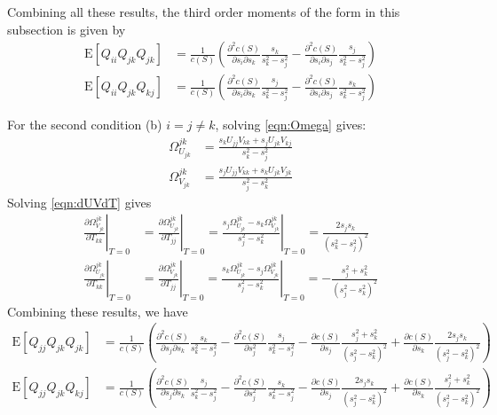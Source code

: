 \documentclass[10pt]{article}
\newcommand{\expect}[1]{\ensuremath{\mathrm{E}\left[ #1 \right]}}
\begin{document}
Combining all these results, the third order moments of the form in this subsection is given by
\begin{align} \label{eqn:iijkjk}
	\expect{Q_{ii}Q_{jk}Q_{jk}} &= \frac{1}{c(S)} \left( \frac{\partial^2 c(S)}{\partial s_i \partial s_k} \frac{s_k}{s_k^2-s_j^2} - \frac{\partial^2 c(S)}{\partial s_i \partial s_j} \frac{s_j}{s_k^2-s_j^2} \right) \nonumber \\
	\expect{Q_{ii}Q_{jk}Q_{kj}} &= \frac{1}{c(S)} \left( \frac{\partial^2 c(S)}{\partial s_i \partial s_k} \frac{s_j}{s_k^2-s_j^2} - \frac{\partial^2 c(S)}{\partial s_i \partial s_j} \frac{s_k}{s_k^2-s_j^2} \right)
\end{align}

For the second condition (b) $i=j\neq k$, solving \eqref{eqn:Omega} gives:
\begin{align}
	\Omega_{U_{jk}}^{jk} &= \frac{s_kU_{jj}V_{kk}+s_jU_{jk}V_{kj}}{s_k^2-s_j^2} \nonumber \\
	\Omega_{V_{jk}}^{jk} &= \frac{s_jU_{jj}V_{kk}+s_kU_{jk}V_{jk}}{s_j^2-s_k^2}
\end{align}
Solving \eqref{eqn:dUVdT} gives
\begin{align}
	\left.\frac{\partial \Omega_{V_{jk}}^{jk}}{\partial T_{kk}}\right|_{T=0} &=
	\left.\frac{\partial \Omega_{U_{jk}}^{jk}}{\partial T_{jj}}\right|_{T=0} = \left.\frac{s_j\Omega_{U_{jk}}^{jk} - s_k\Omega_{V_{jk}}^{jk}}{s_j^2-s_k^2}\right|_{T=0} = \frac{2s_js_k}{(s_k^2-s_j^2)^2} \nonumber \\
	\left.\frac{\partial \Omega_{U_{jk}}^{jk}}{\partial T_{kk}}\right|_{T=0} &= \left.\frac{\partial \Omega_{V_{jk}}^{jk}}{\partial T_{jj}}\right|_{T=0} = \left.\frac{s_k\Omega_{U_{jk}}^{jk} - s_j\Omega_{V_{jk}}^{jk}}{s_j^2-s_k^2}\right|_{T=0} = -\frac{s_j^2+s_k^2}{(s_j^2-s_k^2)^2}
\end{align}
Combining these results, we have
\begin{align} \label{eqn:jjjkjk}
	\expect{Q_{jj}Q_{jk}Q_{jk}} &= \frac{1}{c(S)} \left( \frac{\partial^2 c(S)}{\partial s_j \partial s_k} \frac{s_k}{s_k^2-s_j^2} - \frac{\partial^2 c(S)}{\partial s_j^2} \frac{s_j}{s_k^2-s_j^2} - \frac{\partial c(S)}{\partial s_j} \frac{s_j^2+s_k^2}{(s_j^2-s_k^2)^2} + \frac{\partial c(S)}{\partial s_k} \frac{2s_js_k}{(s_j^2-s_k^2)^2} \right) \nonumber \\
	\expect{Q_{jj}Q_{jk}Q_{kj}} &= \frac{1}{c(S)} \left( \frac{\partial^2 c(S)}{\partial s_j \partial s_k} \frac{s_j}{s_k^2-s_j^2} - \frac{\partial^2 c(S)}{\partial s_j^2} \frac{s_k}{s_k^2-s_j^2} - \frac{\partial c(S)}{\partial s_j} \frac{2s_js_k}{(s_j^2-s_k^2)^2} + \frac{\partial c(S)}{\partial s_k} \frac{s_j^2+s_k^2}{(s_j^2-s_k^2)^2} \right)
\end{align}
\end{document}
